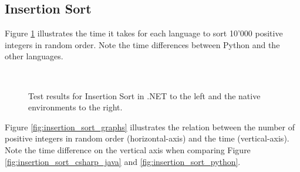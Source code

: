 \subsection{Insertion Sort}

Figure \ref{fig:insertion_sort_results} illustrates the time it takes for each language to sort 10'000 positive integers in random order. Note the time differences between Python and the other languages.

\begin{figure}[h]
	\centering
	\mbox{
	}
	\caption{Test results for Insertion Sort in .NET to the left and the native environments to the right.}
	\label{fig:insertion_sort_results}
\end{figure}

Figure \ref{fig:insertion_sort_graphs} illustrates the relation between the number of positive integers in random order (horizontal-axis) and the time (vertical-axis). Note the time difference on the vertical axis when comparing Figure \ref{fig:insertion_sort_csharp_java} and \ref{fig:insertion_sort_python}.

